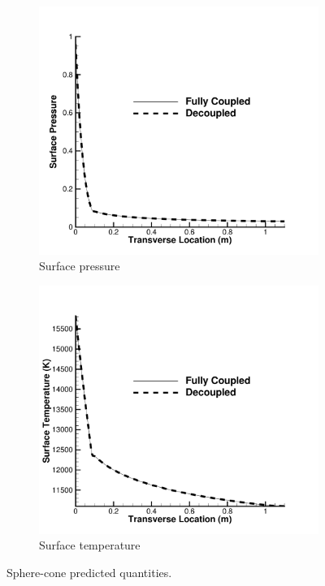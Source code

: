 \begin{figure}
	\centering
	\begin{subfigure}[b]{0.4\textwidth}
		\centering
		\includegraphics[width=\textwidth]{figures/scitech/surface_pressure_cone}
		\caption{Surface pressure}
		\label{cone_pressure}
	\end{subfigure}
	\begin{subfigure}[b]{0.4\textwidth}
		\centering
		\includegraphics[width=\textwidth]{figures/scitech/surface_temperature_cone}
		\caption{Surface temperature}
		\label{cone_temp}
	\end{subfigure}
  \caption{Sphere-cone predicted quantities.}
  \label{cone_predictions}
\end{figure}

